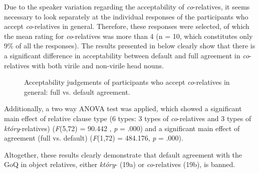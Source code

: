 \documentclass[output=paper]{langsci/langscibook}
\begin{document}
\begin{styleListParagraph}
Due to the speaker variation regarding the acceptability of \textit{co}{}-relatives, it seems necessary to look separately at the individual responses of the participants who accept \textit{co}{}-relatives in general. Therefore, these responses were selected, of which the mean rating for \textit{co}{}-relatives was more than 4 (n = 10, which constitutes only 9\% of all the responses). The results presented in \textbf{} below clearly show that there is a significant difference in acceptability between default and full agreement in \textit{co}{}-relatives with both virile and non-virile head nouns.
\end{styleListParagraph}

\begin{styleListParagraph}
  
 
\end{styleListParagraph}

\begin{styleListParagraph}\begin{figure}
\caption{Acceptability judgements of participants who accept \textit{co}{}-relatives in general: full vs. default agreement.}
\label{fig:key:3}
\end{figure}\end{styleListParagraph}

\begin{styleListParagraph}
Additionally, a two way ANOVA test was applied, which showed a significant main effect of relative clause type (6 types: 3 types of \textit{co}{}-relatives and 3 types of \textit{który}{}-relatives) (\textit{F}(5,72) = 90.442 , \textit{p} = .000) and a significant main effect of agreement (full vs. default) (\textit{F}(1,72) = 484.176, \textit{p} = .000).
\end{styleListParagraph}

\begin{styleListParagraph}
Altogether, these results clearly demonstrate that default agreement with the GoQ in object relatives, either \textit{który}{}- (19a) or \textit{co}{}-relatives (19b), is banned. 
\end{styleListParagraph}

\ea%
    \label{ex:key:19}
    \gll\\
        \\
    \glt
    \z
\end{document}
